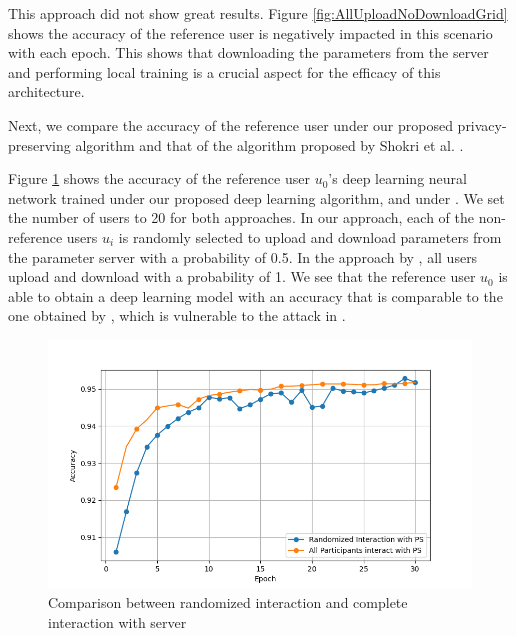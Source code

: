 \documentclass[letterpaper]{article}
\begin{document}
\begin{flushleft}
{This approach did not show great results. Figure \ref{fig:AllUploadNoDownloadGrid} shows the accuracy of the reference user is negatively impacted in this scenario with each epoch. This shows that downloading the parameters from the server and performing local training is a crucial aspect for the efficacy of this architecture.

Next, we compare the accuracy of the reference user under our proposed privacy-preserving algorithm and that of the algorithm proposed
by Shokri et al. \cite{shokri2015privacy}. 


Figure \ref{fig:RandVsAll} shows the accuracy of the reference user $u_0$'s deep learning
neural network trained under our proposed deep learning algorithm, and under \cite{shokri2015privacy}. We set the number of
users to 20 for both approaches. In our approach, each of the non-reference users $u_i$ is randomly
selected to upload and download parameters from the parameter server with a probability of 0.5. 
In the approach by \cite{shokri2015privacy}, all users upload and download with a probability of 1. 
We see that the reference user $u_0$ is able to obtain a deep learning model with an accuracy that is comparable to the one
obtained by \cite{shokri2015privacy}, which is vulnerable to the attack in \cite{hitaj2017deep}. 

\begin{figure}[H]
  \centering
    \includegraphics[width=5in]{RandomVsAllGrid.png}
    \caption[Comparison between randomized complete interaction with server.]{\label{fig:RandVsAll} Comparison between randomized interaction and complete interaction with server}
  \end{figure}





}
\end{flushleft}
\end{document}
